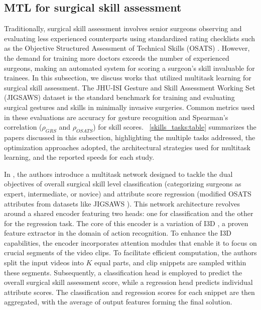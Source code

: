 \documentclass[times,twocolumn,final]{elsarticle}
\renewcommand{\cite}[1]{\citep{#1}}
\newcommand{\tabref}[1]{\tablename~\ref{#1}}
\begin{document}
\subsection{MTL for surgical skill assessment}

Traditionally, surgical skill assessment involves senior surgeons observing and evaluating less experienced counterparts using standardized rating checklists such as the Objective Structured Assessment of Technical Skills (OSATS) \citep{osats}. However, the demand for training more doctors exceeds the number of experienced surgeons, making an automated system for scoring a surgeon's skill invaluable for trainees.
In this subsection, we discuss works that utilized multitask learning for surgical skill assessment. The JHU-ISI Gesture and Skill Assessment Working Set (JIGSAWS) dataset \citep{jigsaws} is the standard benchmark for training and evaluating surgical gestures and skills \cite{lam2022machine} in minimally invasive surgeries. Common metrics used in these evaluations are accuracy for gesture recognition and Spearman's correlation ($\rho_{GRS}$ and $\rho_{OSATS}$) for skill scores.
\tabref{skills_tasks:table} summarizes the papers discussed in this subsection, highlighting the multiple tasks addressed, the optimization approaches adopted, the architectural strategies used for multitask learning, and the reported speeds for each study.  



In \citet{jian2020multitask}, the authors introduce a multitask network designed to tackle the dual objectives of overall surgical skill level classification (categorizing surgeons as expert, intermediate, or novice) and attribute score regression (modified OSATS attributes from datasets like JIGSAWS \citep{jigsaws}). This network architecture revolves around a shared encoder featuring two heads: one for classification and the other for the regression task. The core of this encoder is a variation of  I3D \citep{carreira2017quo}, a proven feature extractor in the domain of action recognition. To enhance the I3D capabilities, the encoder incorporates attention modules that enable it to focus on crucial segments of the video clips.
To facilitate efficient computation, the authors split the input videos into $K$ equal parts, and clip snippets are sampled within these segments.  Subsequently, a classification head is employed to predict the overall surgical skill assessment score, while a regression head predicts individual attribute scores. The classification and regression scores for each snippet are then aggregated, with the average of output features forming the final solution.
\end{document}
